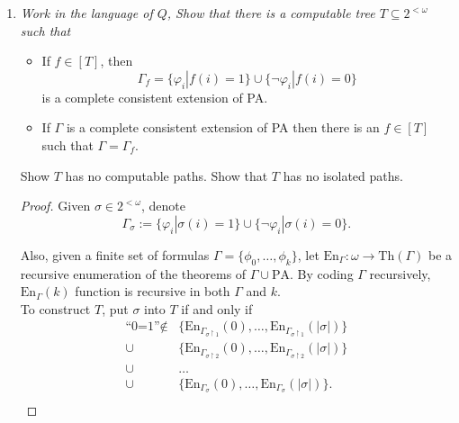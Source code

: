 \documentclass{article}
\begin{document}
\begin{enumerate}[label={\bf Q\arabic*:}]
\begin{proof}
      Assume $T$ contains a path $p$ that is not isolated. Then we can find
      countably infinite distinct paths $\{q_n:n\in\omega\}$ in $T$
      different from $p$ as follows: Staring at $n=0$, since the empty
      string does not isolate $p$, there must be a path $q_0\in T$ that is
      distinct from $p$. For $n+1$, let $\sigma_n\in2^{<\omega}$ denote the
      longest initial segment shared by $p$ and $q_n$. Note that $\sigma_n$
      exists since $p$ and $q_n$ are distinct. Also from construction,
      $|\sigma_n|$ is strictly increasing in $n$. Then let $q_{n+1}$ be a
      path in $T$ that extends $p\restriction(|\sigma_n|+1)$ and that is
      distinct from $p$. Such a $q_{n+1}$ must exist since $\sigma_n$ does
      not isolate $p$. Also, note $q_{n+1}$ will be distinct from
      $\{q_0,\ldots,q_n\}$ from construction. Thus $[T]$ is infinite.
    \end{proof}

  \item \it Work in the language of $Q$, Show that there is a computable
    tree $T\subseteq2^{<\omega}$ such that
    \begin{itemize}
      \item If $f\in[T]$, then
        \[\Gamma_f =\{\varphi_i| f(i)=1\} \cup\{\neg\varphi_i| f(i)=0\}\]
        is a complete consistent extension of PA.

      \item If $\Gamma$ is a complete consistent extension of PA then there
        is an $f\in[T]$ such that $\Gamma=\Gamma_f$.
    \end{itemize}

    Show $T$ has no computable paths. Show that $T$ has no isolated paths.

    \begin{proof}
      Given $\sigma\in2^{<\omega}$, denote
      \[\Gamma_\sigma:= \{\varphi_i| \sigma(i)=1\} \cup\{\neg\varphi_i|
      \sigma(i)=0\}.\]

      Also, given a finite set of formulas $\Gamma=\{\phi_0,\ldots,\phi_k\}$,
      let $\text{En}_\Gamma:\omega\rightarrow\text{Th}(\Gamma)$ be a recursive
      enumeration of the theorems of $\Gamma\cup\text{PA}$. By coding
      $\Gamma$ recursively, $\text{En}_\Gamma(k)$ function is recursive in
      both $\Gamma$ and $k$. \\

      To construct $T$, put $\sigma$ into $T$ if and only if
      \begin{align*}
        \text{``0=1''}\notin &\{\text{En}_{\Gamma_{\sigma\restriction1}}(0),
          \ldots,\text{En}_{\Gamma_{\sigma\restriction1}}(|\sigma|)\}\\
        \cup &\{\text{En}_{\Gamma_{\sigma\restriction2}}(0),
          \ldots,\text{En}_{\Gamma_{\sigma\restriction2}}(|\sigma|)\}\\
        \cup &\ldots\\
        \cup &\{\text{En}_{\Gamma_\sigma}(0),
          \ldots,\text{En}_{\Gamma_\sigma}(|\sigma|)\}.\\
      \end{align*}


\end{proof}
\end{enumerate}
\end{document}
